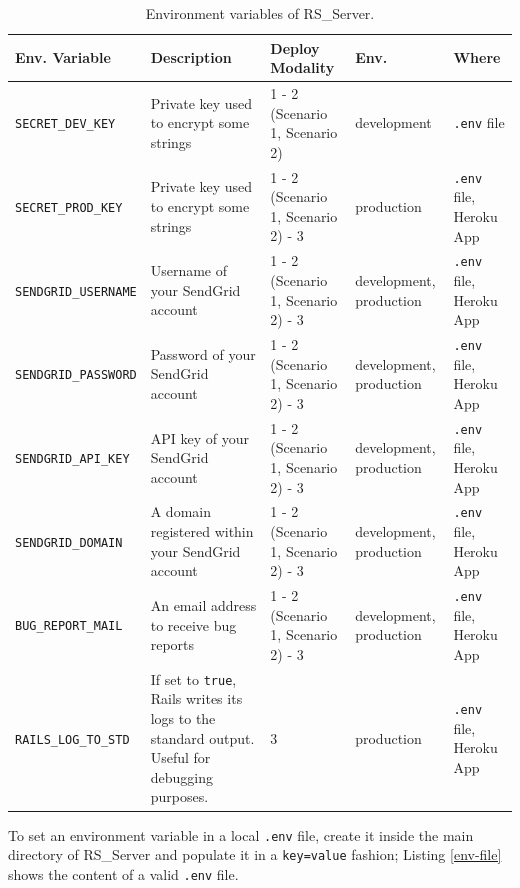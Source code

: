 \documentclass[a4paper, english]{article}
\newcounter{subsubsubsection}[subsubsection]
\begin{document}
\begin{table}
\centering
\begin{threeparttable}
\begin{tabular}{p{3.5cm}p{3cm}p{3cm}p{1.7cm}p{2cm}}
\toprule
\textbf{Env. Variable}  &\textbf{Description} & \textbf{Deploy Modality} & \textbf{Env.} & \textbf{Where} \\
\midrule
\verb|SECRET_DEV_KEY| & Private key used to encrypt some strings & 1 - 2 (Scenario 1, Scenario 2) & development & \verb|.env| file \\
\verb|SECRET_PROD_KEY| & Private key used to encrypt some strings & 1 - 2 (Scenario 1, Scenario 2) - 3 & production & \verb|.env| file, Heroku App \\
\verb|SENDGRID_USERNAME| & Username of your SendGrid account & 1 - 2 (Scenario 1, Scenario 2) - 3 & development, production & \verb|.env| file, Heroku App \\
\verb|SENDGRID_PASSWORD| & Password of your SendGrid account & 1 - 2 (Scenario 1, Scenario 2) - 3 & development, production & \verb|.env| file, Heroku App \\
\verb|SENDGRID_API_KEY| & API key of your SendGrid account & 1 - 2 (Scenario 1, Scenario 2) - 3 & development, production & \verb|.env| file, Heroku App \\
\verb|SENDGRID_DOMAIN| & A domain registered within your SendGrid account & 1 - 2 (Scenario 1, Scenario 2) - 3 & development, production & \verb|.env| file, Heroku App \\
\verb|BUG_REPORT_MAIL| & An email address to receive bug reports & 1 - 2 (Scenario 1, Scenario 2) - 3 & development, production & \verb|.env| file, Heroku App \\
\verb|RAILS_LOG_TO_STD| & If set to \verb|true|, Rails writes its logs to the standard output. Useful for debugging purposes. & 3 & production & \verb|.env| file, Heroku App \\
\bottomrule
\end{tabular}
\caption{Environment variables of RS\_Server.}
\label{env}
 \end{threeparttable}
\end{table}


\label{env-1}

To set an environment variable in a local \verb|.env| file, create it inside the main directory of RS\_Server and populate it in a \verb|key=value| fashion; Listing \ref{env-file} shows the content of a valid \verb|.env| file.
\end{document}
